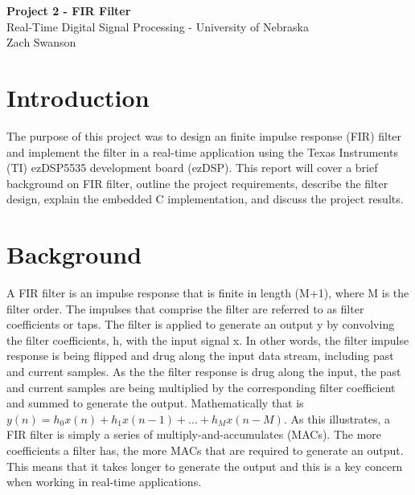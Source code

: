 \documentclass[11pt,pdftex,portrait,letterpaper]{article}
\begin{document}
\vspace*{30ex}
\begin{center}

\textbf{Project 2 - FIR Filter}\\

\vspace{4ex}
Real-Time Digital Signal Processing - University of Nebraska \\

\vspace{4ex}
Zach Swanson\\

\end{center}


\pagebreak
\tableofcontents
\pagebreak


\section{Introduction}

The purpose of this project was to design an finite impulse response (FIR) filter and implement the filter in a real-time application using the Texas Instruments (TI) ezDSP5535 development board (ezDSP). This report will cover a brief background on FIR filter, outline the project requirements, describe the filter design, explain the embedded C implementation, and discuss the project results.

\section{Background}

A FIR filter is an impulse response that is finite in length (M+1), where M is the filter order. The impulses that comprise the filter are referred to as filter coefficients or taps. The filter is applied to generate an output y by convolving the filter coefficients, h,  with the input signal x. In other words, the filter impulse response is being flipped and drug along the input data stream, including past and current samples. As the the filter response is drug along the input, the past and current samples are being multiplied by the corresponding filter coefficient and summed to generate the output. Mathematically that is \(y(n) = h_0x(n) + h_1x(n-1) + ... + h_Mx(n-M)\). As this illustrates, a FIR filter is simply a series of multiply-and-accumulates (MACs). The more coefficients a filter has, the more MACs that are required to generate an output. This means that it takes longer to generate the output and this is a key concern when working in real-time applications.
\end{document}
